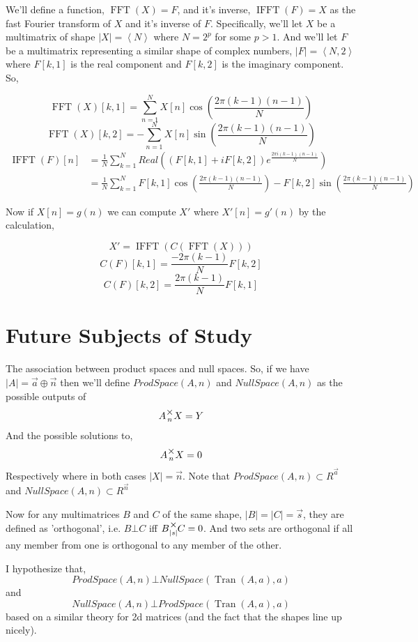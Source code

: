 \documentclass[12pt]{book}
\theoremstyle{plain}
\theoremstyle{definition}
\theoremstyle{ppart}
\theoremstyle{case}
\theoremstyle{solution}
\DeclareMathOperator{\Tran}{Tran}
\DeclareMathOperator{\FFT}{FFT}
\DeclareMathOperator{\IFFT}{IFFT}
\newcommand{\mmult}[1]{\text{\raisebox{1ex}{$\underset{#1}{\times}$}}}
\newcommand{\shape}[1]{\left|#1\right|}
\begin{document}
\begin{appendices}
\begin{landscape}
We'll define a function, $\FFT(X) = F$, and it's inverse, $\IFFT(F) = X$ as the fast Fourier transform of $X$ and it's inverse of $F$.
Specifically, we'll let $X$ be a multimatrix of shape $\shape{X} = \left<N\right>$ where $N = 2^p$ for some $p>1$.
And we'll let $F$ be a multimatrix representing a similar shape of complex numbers, $\shape{F} = \left<N, 2\right>$ where $F[k,1]$ is
the real component and $F[k,2]$ is the imaginary component. So,

\[ \FFT(X)[k,1] = \sum_{n=1}^{N} X[n] \cos\left(\frac{2 \pi (k-1)(n-1)}{N}\right) \]
\[ \FFT(X)[k,2] = -\sum_{n=1}^{N} X[n] \sin\left(\frac{2 \pi (k-1)(n-1)}{N}\right) \]
\begin{align*}
  \IFFT(F)[n]
  &= \frac{1}{N} \sum_{k=1}^{N} Real\left( (F[k,1]+i F[k,2]) e^{\frac{2 \pi i (k-1)(n-1)}{N} } \right) \\
  &= \frac{1}{N} \sum_{k=1}^{N} F[k,1] \cos\left(\frac{2 \pi (k-1)(n-1)}{N}\right) - F[k,2] \sin\left(\frac{2 \pi (k-1)(n-1)}{N}\right)
\end{align*}

Now if $X[n] = g(n)$ we can compute $X'$ where $X'[n] = g'(n)$ by the calculation,

\[ X' = \IFFT(C(\FFT(X))) \]
\[ C(F)[k,1] = \frac{-2 \pi (k-1)}{N} F[k,2] \]
\[ C(F)[k,2] = \frac{2 \pi (k-1)}{N} F[k,1] \]

\end{landscape}

\chapter{Future Subjects of Study}

The association between product spaces and null spaces. So, if we have $\shape{A} = \vec{a} \oplus \vec{n}$
then we'll define $ProdSpace(A, n)$ and $NullSpace(A, n)$ as the possible outputs of
\[ A \mmult{n} X = Y \]
And the possible solutions to,
\[ A \mmult{n} X = 0 \]
Respectively where in both cases $\shape{X} = \vec{n}$. 
Note that $ProdSpace(A, n) \subset R^{\vec{a}}$ and $NullSpace(A, n) \subset R^{\vec{n}}$

Now for any multimatrices $B$ and $C$ of the same shape, $\shape{B} = \shape{C} = \vec{s}$,
they are defined as 'orthogonal', i.e. $B \bot C$ iff $B \mmult{\shape{s}} C = 0$.
And two sets are orthogonal if all any member from one is orthogonal to any member of the other.

I hypothesize that,
\[ProdSpace(A, n) \bot NullSpace(\Tran(A, a), a)\]
and
\[NullSpace(A, n) \bot ProdSpace(\Tran(A, a), a)\]
based on a similar theory for 2d matrices \cite{youtube:orthogonal} (and the fact that the shapes line up nicely).


\end{appendices}
\end{document}
